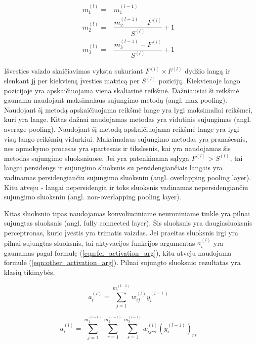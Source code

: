 \begin{equation}
\label{eqn:pool_layer_dims}
	\begin{split}
		m_1^{(l)} = & m_1^{(l-1)} \\
		m_2^{(l)} = & \dfrac{m_2^{(l-1)} - F^{(l)}}{S^{(l)}} + 1 \\
		m_3^{(l)} = & \dfrac{m_3^{(l-1)} - F^{(l)}}{S^{(l)}} + 1
	\end{split}
\end{equation}

Išvesties vaizdo skaičiavimas vyksta sukuriant $ F^{(l)} \times  F^{(l)}$ dydžio langą ir slenkant jį per kiekvieną įvesties matricą per $S^{(l)}$ pozicijų. Kiekvienoje lango pozicijoje yra apskaičiuojama viena skaliarinė reikšmė. Dažniausiai ši reikšmė gaunama naudojant maksimalaus sujungimo metodą (angl. max pooling). Naudojant šį metodą apskaičiuojama reikšmė lange yra lygi maksimaliai reikšmei, kuri yra lange. Kitas dažnai naudojamas metodas yra vidutinis sujungimas (angl. average pooling). Naudojant šį metodą apskaičiuojama reikšmė lange yra lygi visų lango reikšmių vidurkiui. Maksimalaus sujungimo metodas yra pranašesnis, nes apmokymo procesas yra spartesnis ir tikslesnis, kai yra naudojamas šis metodas sujungimo sluoksniuose. Jei yra patenkinama sąlyga $F^{(l)} > S^{(l)}$, tai langai persidengs ir sujungimo sluoksnis su persidengiančiais langais yra vadinamas persidengiančiu sujungimo sluoksniu (angl. overlapping pooling layer). Kitu atveju - langai nepersidengia ir toks sluoksnis vadinamas nepersidengiančiu sujungimo sluoksniu (angl. non-overlapping pooling layer).

Kitas sluoksnio tipas naudojamas konvoliuciniame neuroniniame tinkle yra pilnai sujungtas sluoksnis (angl. fully connected layer). Šis sluoksnis yra daugiasluoksnis perceptronas, kurio įvestis yra trimatis vaizdas. Jei praeitas sluoksnis irgi yra pilnai sujungtas sluoksnis, tai aktyvacijos funkcijos argumentas $a_i^{(l)}$ yra gaunamas pagal formulę (\ref{eqn:fcl_activation_arg}), kitu atveju naudojama formulė (\ref{eqn:other_activation_arg}). Pilnai sujungto sluoksnio rezultatas yra klasių tikimybės.


\begin{equation}
\label{eqn:fcl_activation_arg}
	a_i^{(l)} = \sum_{j = 1}^{m_1^{(l-1)}} w_{ij}^{(l)}y_i^{(l-1)}
\end{equation}

\begin{equation}
\label{eqn:other_activation_arg}
	a_i^{(l)} = \sum_{j = 1}^{m_1^{(l-1)}} \sum_{r = 1}^{m_2^{(l-1)}} \sum_{s = 1}^{m_3^{(l-1)}} w_{ijrs}^{(l)} (y_i^{(l-1)})_{rs}
\end{equation}

